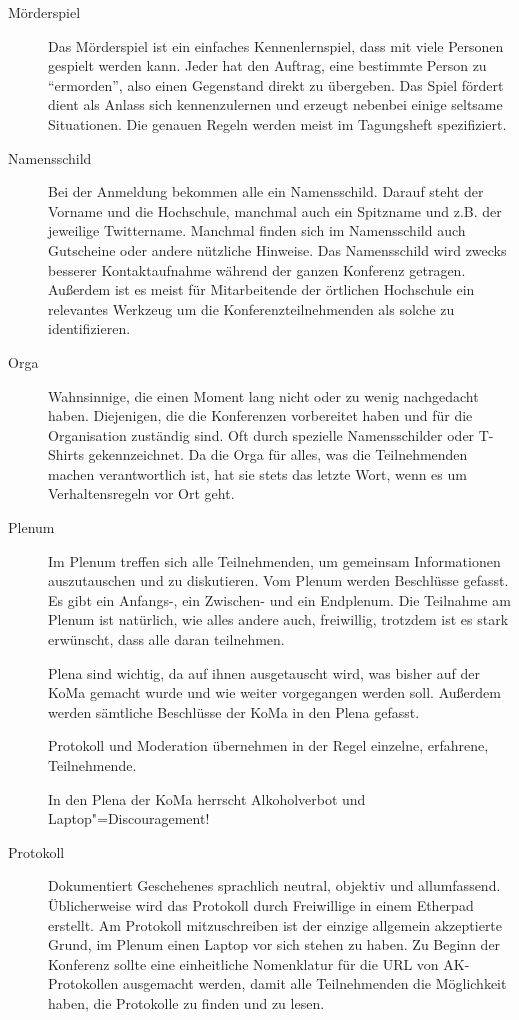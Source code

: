 \begin{description}
\item[Mörderspiel]
    Das Mörderspiel ist ein einfaches Kennenlernspiel, dass mit viele Personen gespielt werden kann. Jeder hat den Auftrag, eine bestimmte Person zu \enquote{ermorden}, also einen Gegenstand direkt zu übergeben.
    Das Spiel fördert dient als Anlass sich kennenzulernen und erzeugt nebenbei einige seltsame Situationen.
    Die genauen Regeln werden meist im Tagungsheft spezifiziert.
    
\item[Namensschild]
    Bei der Anmeldung bekommen alle ein	Namensschild. Darauf steht der Vorname und die Hochschule, manchmal auch ein Spitzname und z.B. der jeweilige Twittername. Manchmal finden sich im Namensschild auch Gutscheine oder andere nützliche Hinweise. Das Namensschild wird zwecks besserer Kontaktaufnahme während der ganzen Konferenz getragen. Außerdem ist es meist für Mitarbeitende der örtlichen Hochschule ein relevantes Werkzeug um die Konferenzteilnehmenden als solche zu identifizieren.

\item[Orga]
    Wahnsinnige, die einen Moment lang nicht oder zu wenig nachgedacht haben. Diejenigen, die die Konferenzen vorbereitet haben und für die Organisation zuständig sind. Oft durch spezielle Namensschilder oder T-Shirts gekennzeichnet.
    Da die Orga für alles, was die Teilnehmenden machen verantwortlich ist, hat sie stets das letzte Wort, wenn es um Verhaltensregeln vor Ort geht.

\item[Plenum]
    Im Plenum treffen sich alle Teilnehmenden, um gemeinsam Informationen auszutauschen und zu diskutieren. Vom Plenum werden Beschlüsse gefasst. Es gibt ein Anfangs-, ein Zwischen- und ein Endplenum. Die Teilnahme am Plenum ist natürlich, wie alles andere auch, freiwillig, trotzdem ist es stark erwünscht, dass alle daran teilnehmen.
    
    Plena sind wichtig, da auf ihnen ausgetauscht wird, was bisher auf der KoMa gemacht wurde und wie weiter vorgegangen werden soll. Außerdem werden sämtliche Beschlüsse der KoMa in den Plena gefasst.
    
	Protokoll und Moderation übernehmen in der Regel einzelne, erfahrene, Teilnehmende.
    
    In den Plena der KoMa herrscht Alkoholverbot und Laptop"=Discouragement!

\item[Protokoll]
    Dokumentiert Geschehenes sprachlich neutral, objektiv und allumfassend. Üblicherweise wird das Protokoll durch Freiwillige in einem Etherpad erstellt. Am Protokoll mitzuschreiben ist der einzige allgemein akzeptierte Grund, im Plenum einen Laptop vor sich stehen zu haben.
	Zu Beginn der Konferenz sollte eine einheitliche Nomenklatur für die URL von AK-Protokollen ausgemacht werden, damit alle Teilnehmenden die Möglichkeit haben, die Protokolle zu finden und zu lesen.


\end{description}
